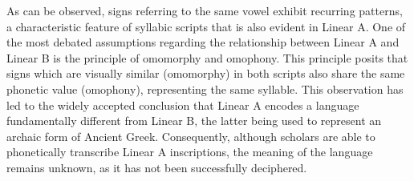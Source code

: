 As can be observed, signs referring to the same vowel exhibit recurring patterns, a characteristic feature of syllabic scripts that is also evident in Linear A.
One of the most debated assumptions regarding the relationship between Linear A and Linear B is the principle of omomorphy and omophony.
This principle posits that signs which are visually similar (omomorphy) in both scripts also share the same phonetic value (omophony), representing the same syllable.
This observation has led to the widely accepted conclusion that Linear A encodes a language fundamentally different from Linear B, the latter being used to represent an archaic form of Ancient Greek.
Consequently, although scholars are able to phonetically transcribe Linear A inscriptions, the meaning of the language remains unknown, as it has not been successfully deciphered.

